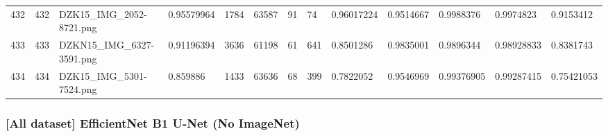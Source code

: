 \documentclass[11pt, a4paper, twoside]{report}
\begin{document}
\begin{longtable}[c]{@{}lllllllllllll@{}}
432 & 432 & DZK15\_IMG\_2052-8721.png & 0.95579964 & 1784 & 63587 & 91 & 74 & 0.96017224 & 0.9514667 & 0.9988376 & 0.9974823 & 0.9153412 \\
433 & 433 & DZKN15\_IMG\_6327-3591.png & 0.91196394 & 3636 & 61198 & 61 & 641 & 0.8501286 & 0.9835001 & 0.9896344 & 0.98928833 & 0.8381743 \\
434 & 434 & DZK15\_IMG\_5301-7524.png & 0.859886 & 1433 & 63636 & 68 & 399 & 0.7822052 & 0.9546969 & 0.99376905 & 0.99287415 & 0.75421053 \\* \bottomrule
\end{longtable}

\newpage

\subsubsection{[All dataset] EfficientNet B1 U-Net (No ImageNet)}
\end{document}
